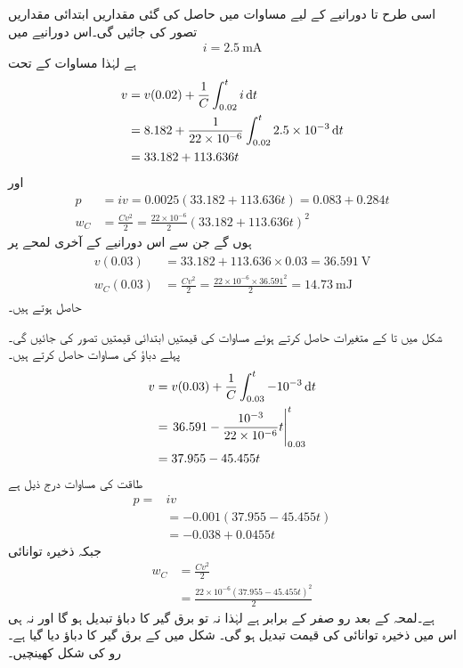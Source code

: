 اسی طرح  تا  دورانیے کے لیے مساوات  میں حاصل کی گئی مقداریں ابتدائی مقداریں تصور کی جائیں گی۔اس دورانیے میں
\begin{align*}
i=\SI{2.5}{\milli\ampere}
\end{align*}
ہے لہٰذا مساوات  کے تحت
\begin{align*}
v&=v(0.02)+\frac{1}{C}\int_{0.02}^t i \dif t\\
&=8.182 +\frac{1}{22\times 10^{-6}}\int_{0.02}^t 2.5\times 10^{-3} \dif t\\
&=33.182+113.636t
\end{align*}
اور
\begin{align*}
p&=iv=0.0025 (33.182+113.636t)=0.083+0.284t\\
w_C&=\frac{C v^2}{2}=\frac{22\times 10^{-6}}{2} (33.182+113.636t)^2
\end{align*}
ہوں گے جن سے اس دورانیے کے آخری لمحے پر
\begin{gather}
\begin{aligned}\label{مساوات_امالہ_ابتدائی_قیمتیں_ب}
v(0.03)&=33.182+113.636\times 0.03=\SI{36.591}{\volt}\\
w_C(0.03)&=\frac{Cv^2}{2}=\frac{22\times 10^{-6} \times 36.591^2}{2}=\SI{14.73}{\milli\joule}
\end{aligned}
\end{gather}
حاصل ہوتے ہیں۔

شکل  میں  تا  کے متغیرات حاصل کرتے ہوئے مساوات  کی قیمتیں ابتدائی قیمتیں تصور کی جائیں گی۔پہلے دباؤ کی مساوات حاصل کرتے ہیں۔
\begin{align*}
v&=v(0.03)+\frac{1}{C}\int_{0.03}^{t}-10^{-3} \dif t\\
&=\left. 36.591-\frac{10^{-3}}{22\times 10^{-6}}t\right|_{0.03}^{t}\\
&=37.955-45.455t
\end{align*}
طاقت کی مساوات درج ذیل ہے
\begin{align*}
p=&iv  \\
&=-0.001(37.955-45.455t)\\
&=-0.038+0.0455t
\end{align*}
جبکہ ذخیرہ توانائی
\begin{align*}
w_C&=\frac{Cv^2}{2}\\
&=\frac{22\times 10^{-6} (37.955-45.455t)^2}{2}
\end{align*}
ہے۔لمحہ  کے بعد رو صفر کے برابر ہے لہٰذا نہ تو برق گیر کا دباؤ تبدیل ہو گا اور نہ ہی اس میں ذخیرہ توانائی  کی قیمت تبدیل ہو گی۔
شکل  میں  کے برق گیر کا دباؤ دیا گیا ہے۔رو کی شکل کھینچیں۔

